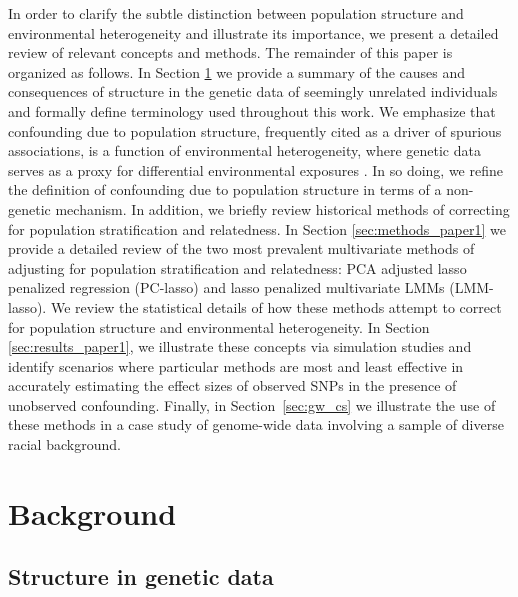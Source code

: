 In order to clarify the subtle distinction between population structure and environmental heterogeneity and illustrate its importance, we present a detailed review of relevant concepts and methods. The remainder of this paper is organized as follows. In Section \ref{sec:background_paper1} we provide a summary of the causes and consequences of structure in the genetic data of seemingly unrelated individuals and formally define terminology used throughout this work. We emphasize that confounding due to population structure, frequently cited as a driver of spurious associations, is a function of environmental heterogeneity, where genetic data serves as a proxy for differential environmental exposures \citep{Sillanpaeae2011, sul2018population, vilhjalmsson2012nature, barton2019population}. In so doing, we refine the definition of confounding due to population structure in terms of a non-genetic mechanism. In addition, we briefly review historical methods of correcting for population stratification and relatedness. In Section \ref{sec:methods_paper1} we provide a detailed review of the two most prevalent multivariate methods of adjusting for population stratification and relatedness: PCA adjusted lasso penalized regression (PC-lasso) and lasso penalized multivariate LMMs (LMM-lasso). We review the statistical details of how these methods attempt to correct for population structure and environmental heterogeneity. In Section \ref{sec:results_paper1}, we illustrate these concepts via simulation studies and identify scenarios where particular methods are most and least effective in accurately estimating the effect sizes of observed SNPs in the presence of unobserved confounding. Finally, in Section~\ref{sec:gw_cs} we illustrate the use of these methods in a case study of genome-wide data involving a sample of diverse racial background.

\section{Background} \label{sec:background_paper1}

\subsection{Structure in genetic data}


